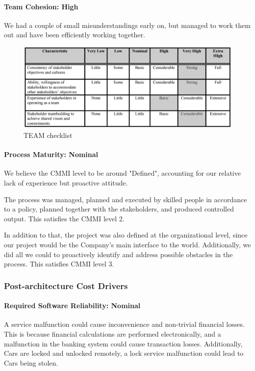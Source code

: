 \paragraph*{Team Cohesion: High}
We had a couple of small misunderstandings early on, but managed to work them out and have been efficiently working together.

\begin{figure}[h!]
	\centering
	\includegraphics[width=\textwidth]{Images/TEAM}
	\caption{TEAM checklist}
\end{figure}

\paragraph*{Process Maturity: Nominal}
We believe the CMMI level to be around "Defined", accounting for our relative lack of experience but proactive attitude.

The process was managed, planned and executed by skilled people in accordance to a policy, planned together with the stakeholders, and produced controlled output. This satisfies the CMMI level 2.

In addition to that, the project was also defined at the organizational level, since our project would be the Company's main interface to the world. Additionally, we did all we could to proactively identify and address possible obstacles in the process. This satisfies CMMI level 3.

\subsubsection{Post-architecture Cost Drivers}
\paragraph*{Required Software Reliability: Nominal}
A service malfunction could cause inconvenience and non-trivial financial losses. This is because financial calculations are performed electronically, and a malfunction in the banking system could cause transaction losses. Additionally, Cars are locked and unlocked remotely, a lock service malfunction could lead to Cars being stolen.


